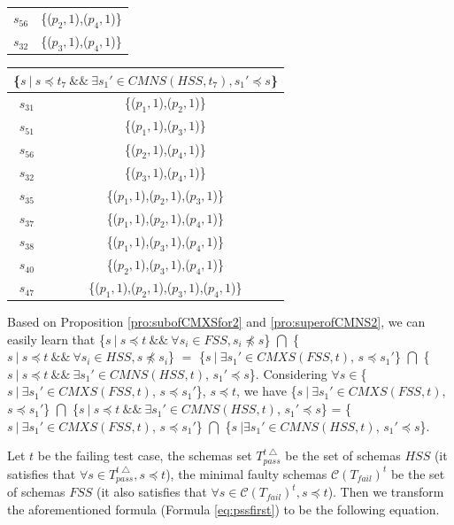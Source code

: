 {\begin{table}[htbp]
\begin{tabular}{|c|c|}
   $s_{56}$ & \{($p_{2}, 1$),($p_{4}, 1$)\} \\
   $s_{32}$ & \{($p_{3}, 1$),($p_{4}, 1$)\} \\
    \hline
    \end{tabular}%
\quad
    \begin{tabular}{|c|c|} \hline
   \multicolumn{2}{|c|}{\{$ s\ |\ s \preceq t_{7}\ \&\& \ \exists s_{1}' \in CMNS(HSS, t_{7}), s_{1}' \preceq s$\}}\\ \hline

   $s_{31}$ & \{($p_{1}, 1$),($p_{2}, 1$)\} \\
   $s_{51}$ & \{($p_{1}, 1$),($p_{3}, 1$)\} \\

   $s_{56}$ & \{($p_{2}, 1$),($p_{4}, 1$)\} \\
   $s_{32}$ & \{($p_{3}, 1$),($p_{4}, 1$)\} \\

   $s_{35}$ & \{($p_{1}, 1$),($p_{2}, 1$),($p_{3}, 1$)\} \\
   $s_{37}$ & \{($p_{1}, 1$),($p_{2}, 1$),($p_{4}, 1$)\} \\
   $s_{38}$ & \{($p_{1}, 1$),($p_{3}, 1$),($p_{4}, 1$)\} \\
   $s_{40}$ & \{($p_{2}, 1$),($p_{3}, 1$),($p_{4}, 1$)\} \\

   $s_{47}$ & \{($p_{1}, 1$),($p_{2}, 1$),($p_{3}, 1$),($p_{4}, 1$)\} \\ \hline
    \end{tabular}%
\end{table}


Based on Proposition \ref{pro:subofCMXSfor2} and \ref{pro:superofCMNS2}, we can easily learn that \{$s\ |\ s \preceq t\ \&\&\ \forall s_{i} \in FSS, s_{i} \npreceq s $\} $\bigcap$ \{$s\ |\ s \preceq t\ \&\&\ \forall s_{i} \in HSS, s \npreceq s_{i} $\}  $=$  \{$ s\ |\ \exists s_{1}' \in CMXS(FSS, t)$, $s \preceq s_{1}'$\} $\bigcap$  \{$ s\ |\ s \preceq t \ \&\& \ \exists s_{1}' \in CMNS(HSS, t)$, $s_{1}' \preceq s$\}.  Considering $\forall s \in $\{$ s\ |\ \exists s_{1}' \in CMXS(FSS, t)$, $s \preceq s_{1}'$\}, $s \preceq t$, we have  \{$ s\ |\ \exists s_{1}' \in CMXS(FSS, t)$, $s \preceq s_{1}'$\} $\bigcap$  \{$ s\ |\ s \preceq t \ \&\& \ \exists s_{1}' \in CMNS(HSS, t)$, $s_{1}' \preceq s$\} =  \{$ s\ |\ \exists s_{1}' \in CMXS(FSS, t)$, $s \preceq s_{1}'$\} $\bigcap$  \{$ s\ | \exists s_{1}' \in CMNS(HSS, t)$, $s_{1}' \preceq s$\}.

Let $t$ be the failing test case, the schemas set $T_{pass}^{t\bigtriangleup}$ be the set of schemas $HSS$ (it satisfies that $\forall s \in T_{pass}^{t\bigtriangleup}, s \preceq t $), the minimal faulty schemas $\mathcal{C}(T_{fail})^{t}$ be the set of schemas $FSS$ (it also satisfies that $\forall s \in \mathcal{C}(T_{fail})^{t}, s \preceq t $). Then we transform the aforementioned formula (Formula \ref{eq:pssfirst}) to be the following equation.

}
